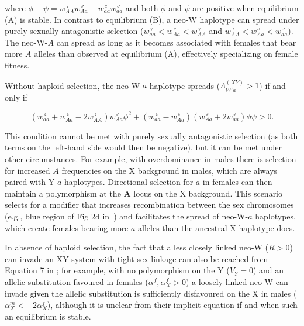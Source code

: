 \documentclass[10pt,letterpaper]{article}
\begin{document}
\noindent  
where $\phi-\psi=w_{AA}^\female w_{Aa}^\male-w_{aa}^\female w_{aa}^\male$ and both $\phi$ and $\psi$ are positive when equilibrium (A) is stable. 
In contrast to equilibrium (B), a neo-W haplotype can spread under purely sexually-antagonistic selection  ($w_{aa}^\female<w_{Aa}^\female<w_{AA}^\female$ and $w_{AA}^\male<w_{Aa}^\male<w_{aa}^\male$).
The neo-W-$A$ can spread as long as it becomes associated with females that bear more $A$ alleles than observed at equilibrium (A), effectively specializing on female fitness. 

Without haploid selection, the neo-W-$a$ haplotype spreads ($\Lambda_{W'a}^{(XY)}>1$) if and only if

\begin{equation}\label{eq:BeqWaspread}
(w_{aa}^\female + w_{Aa}^\female-2w_{AA}^\female)w_{Aa}^\male \phi^2 + (w_{aa}^\female-w_{Aa}^\female)(w_{Aa}^\male+2w_{aa}^\male) \phi \psi >0.
\end{equation}

\noindent
This condition cannot be met with purely sexually antagonistic selection (as both terms on the left-hand side would then be negative), but it can be met under other circumstances. 
For example, with overdominance in males there is selection for increased $A$ frequencies on the X background in males, which are always paired with Y-$a$ haplotypes.
Directional selection for $a$ in females can then maintain a polymorphism at the $\mathbf{A}$ locus on the X background.
This scenario selects for a modifier that increases recombination between the sex chromosomes (e.g., blue region of Fig 2d in~\cite{Otto2014}) and facilitates the spread of neo-W-$a$ haplotypes, which create females bearing more $a$ alleles than the ancestral X haplotype does. 

In absence of haploid selection, the fact that a less closely linked neo-W ($R>0$) can invade an XY system with tight sex-linkage can also be reached from Equation 7 in \cite{vanDoorn:2010hu}; for example, with no polymorphism on the Y ($V_Y=0$) and an allelic substitution favoured in females ($\alpha^f,\alpha_X^f>0$) a loosely linked neo-W can invade given the allelic substitution is sufficiently disfavoured on the X in males ($\alpha_X^m < -2\alpha_X^f$), although it is unclear from their implicit equation if and when such an equilibrium is stable.
\end{document}

